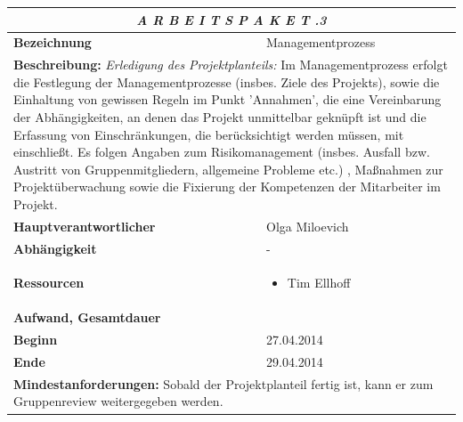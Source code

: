 \documentclass[fontsize=12pt,paper=a4,twoside]{scrartcl}
\begin{document}
\begin{tabular}{p{7.5cm}|p{7.5cm}}\toprule
\multicolumn{2}{c}{\textbf{\textit{A R B E I T S P A K E T \quad 1.1.3}}} \\ \toprule \hline
\textbf{Bezeichnung} & Managementprozess\\\hline
\multicolumn{2}{p{15cm}}{\textbf{Beschreibung:} \newline 
\textit{Erledigung des Projektplanteils:} Im Managementprozess erfolgt die Festlegung der Managementprozesse (insbes. Ziele des Projekts), sowie die Einhaltung von gewissen Regeln im Punkt 'Annahmen', die eine Vereinbarung der Abhängigkeiten, an denen das Projekt unmittelbar geknüpft ist und die Erfassung von Einschränkungen, die berücksichtigt werden müssen, mit einschließt. Es folgen Angaben zum Risikomanagement (insbes. Ausfall bzw. Austritt von Gruppenmitgliedern, allgemeine Probleme etc.) , Maßnahmen zur Projektüberwachung sowie die Fixierung der Kompetenzen der Mitarbeiter im Projekt.  }  \\\hline
\textbf{Hauptverantwortlicher} & Olga Miloevich\\\hline
\textbf{Abhängigkeit} & -\\\hline
\textbf{Ressourcen} & \begin{itemize}
\itemsep0pt
\item Tim Ellhoff
\end{itemize} \\\hline
\textbf{Aufwand, Gesamtdauer} & \\\hline
\textbf{Beginn} & 27.04.2014 \\\hline
\textbf{Ende} & 29.04.2014\\\hline
\multicolumn{2}{p{15cm}}{\textbf{Mindestanforderungen: } \newline
Sobald der Projektplanteil fertig ist, kann er zum Gruppenreview weitergegeben werden. }  \\ \toprule
\end{tabular} \\\\
\end{document}
